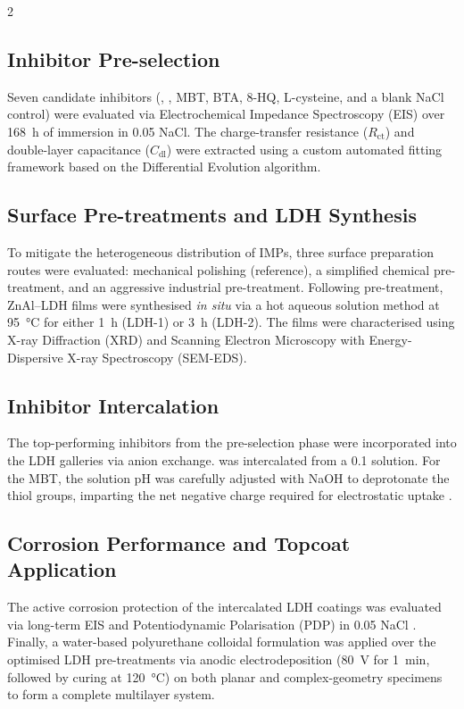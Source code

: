 \documentclass[a4paper,10pt]{article}
\begin{document}
\begin{multicols}{2}
\subsection{Inhibitor Pre-selection}
Seven candidate inhibitors (, , MBT, BTA, 8-HQ, L-cysteine, and a blank NaCl control) were evaluated via Electrochemical Impedance Spectroscopy (EIS) over \qty{168}{\hour} of immersion in \qty{0.05}{\molar} NaCl. The charge-transfer resistance ($R_{\text{ct}}$) and double-layer capacitance ($C_{\text{dl}}$) were extracted using a custom automated fitting framework based on the Differential Evolution algorithm.

\subsection{Surface Pre-treatments and LDH Synthesis}
To mitigate the heterogeneous distribution of IMPs, three surface preparation routes were evaluated: mechanical polishing (reference), a simplified chemical pre-treatment, and an aggressive industrial pre-treatment. Following pre-treatment, ZnAl--LDH films were synthesised \textit{in situ} via a hot aqueous solution method at \qty{95}{\degreeCelsius} for either \qty{1}{\hour} (LDH-1) or \qty{3}{\hour} (LDH-2). The films were characterised using X-ray Diffraction (XRD) and Scanning Electron Microscopy with Energy-Dispersive X-ray Spectroscopy (SEM-EDS).

\subsection{Inhibitor Intercalation}
The top-performing inhibitors from the pre-selection phase were incorporated into the LDH galleries via anion exchange.  was intercalated from a \qty{0.1}{\molar} solution. For the MBT, the solution pH was carefully adjusted with NaOH to deprotonate the thiol groups, imparting the net negative charge required for electrostatic uptake \cite{Tedim2010}.

\subsection{Corrosion Performance and Topcoat Application}
The active corrosion protection of the intercalated LDH coatings was evaluated via long-term EIS and Potentiodynamic Polarisation (PDP) in \qty{0.05}{\molar} NaCl \cite{Orazem2008}. Finally, a water-based polyurethane colloidal formulation was applied over the optimised LDH pre-treatments via anodic electrodeposition (\qty{80}{\volt} for \qty{1}{\minute}, followed by curing at \qty{120}{\degreeCelsius}) on both planar and complex-geometry specimens to form a complete multilayer system.


\end{multicols}
\end{document}
